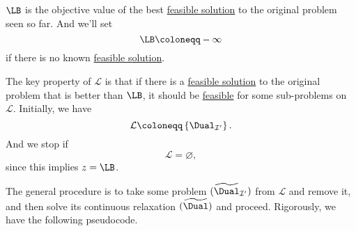\begin{note}
	\(\LB \) is the objective value of the best \hyperref[def:feasible-solution]{feasible solution} to the original problem seen so far. And we'll set
	\[
		\LB \coloneqq  -\infty
	\]
	if there is no known \hyperref[def:feasible-solution]{feasible solution}.
\end{note}
\begin{remark}
	The key property of \(\mathcal{L} \) is that if there is a \hyperref[def:feasible-solution]{feasible solution} to the original problem that is better than \(\LB \), it should be \hyperref[def:feasible-solution]{feasible} for some sub-problems on \(\mathcal{L} \). Initially, we have
	\[
		\mathcal{L} \coloneqq \left\{\Dual _{\mathcal{I}^\prime }\right\}.
	\]
	And we stop if
	\[
		\mathcal{L} = \varnothing,
	\]
	since this implies \(z = \LB \).
\end{remark}

The general procedure is to take some problem \((\widetilde{\Dual}_{\mathcal{I}^\prime })\) from \(\mathcal{L}\) and remove it, and then solve its continuous relaxation \((\widetilde{\Dual})\) and proceed. Rigorously, we have the following pseudocode.

